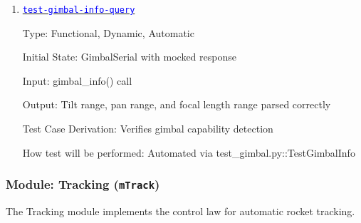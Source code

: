 \documentclass[12pt, titlepage]{article}
\newcommand{\mref}[1]{\texttt{#1}}
\newcommand{\tid}[1]{\hyperlink{tid:#1}{\textcolor{blue}{\texttt{#1}}}}
\begin{document}
\begin{enumerate}
        Type: Functional, Dynamic, Automatic

        Initial State: GimbalSerial with mocked serial port

        Input: set\_arm\_led(True/False) and set\_status\_led(True/False)

        Output: True on success; serial write called with correct packets

        Test Case Derivation: Verifies visual feedback control for armed status

        How test will be performed: Automated via test\_gimbal.py::TestLedCommands

  \item{\tid{test-gimbal-info-query}\\}

        Type: Functional, Dynamic, Automatic

        Initial State: GimbalSerial with mocked response

        Input: gimbal\_info() call

        Output: Tilt range, pan range, and focal length range parsed correctly

        Test Case Derivation: Verifies gimbal capability detection

        How test will be performed: Automated via test\_gimbal.py::TestGimbalInfo

\end{enumerate}

\subsubsection{Module: Tracking (\mref{mTrack})}

The Tracking module implements the control law for automatic rocket tracking.
\end{document}
